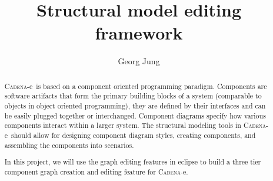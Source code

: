 \documentclass[a4paper]{article}
\title{Structural model editing framework}
\author{Georg Jung}
\newcommand{\CADENA}{\textsc{Cadena}-e}
\begin{document}
\maketitle

\begin{abstract}
  \CADENA\ is based on a component oriented programming
  paradigm. Components are software artifacts that form the primary
  building blocks of a system (comparable to objects in object
  oriented programming), they are defined by their interfaces and can
  be easily plugged together or interchanged. Component diagrams
  specify how various components interact within a larger system. The
  structural modeling tools in \CADENA\ should allow for designing
  component diagram styles, creating components, and assembling the
  components into scenarios.

  In this project, we will use the graph editing features in eclipse
  to build a three tier component graph creation and editing feature
  for \CADENA.
\end{abstract}
\end{document}
